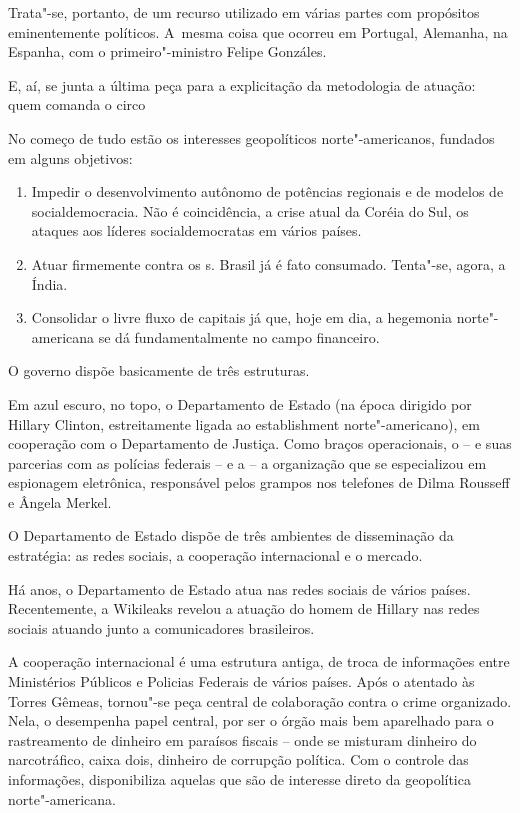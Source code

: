 Trata"-se, portanto, de um recurso utilizado em várias partes com
propósitos eminentemente políticos. A~mesma coisa que ocorreu em
Portugal, Alemanha, na Espanha, com o primeiro"-ministro Felipe Gonzáles.

E, aí, se junta a última peça para a explicitação da metodologia de
atuação: quem comanda o circo

 

No começo de tudo estão os interesses geopolíticos norte"-americanos,
fundados em alguns objetivos:

\begin{enumerate}
\itemsep1pt\parskip0pt
\item
  Impedir o desenvolvimento autônomo de potências regionais e de modelos
  de socialdemocracia. Não é coincidência, a crise atual da Coréia do
  Sul, os ataques aos líderes socialdemocratas em vários países.
\item
  Atuar firmemente contra os s. Brasil já é fato consumado.
  Tenta"-se, agora, a Índia.
\item
  Consolidar o livre fluxo de capitais já que, hoje em dia, a hegemonia
  norte"-americana se dá fundamentalmente no campo financeiro.
\end{enumerate}

O governo dispõe basicamente de três estruturas.

Em azul escuro, no topo, o Departamento de Estado (na época dirigido por
Hillary Clinton, estreitamente ligada ao establishment norte"-americano),
em cooperação com o Departamento de Justiça. Como braços operacionais, o
 -- e suas parcerias com as polícias federais -- e a  -- a
organização que se especializou em espionagem eletrônica, responsável
pelos grampos nos telefones de Dilma Rousseff e Ângela Merkel.

O Departamento de Estado dispõe de três ambientes de disseminação da
estratégia: as redes sociais, a cooperação internacional e o mercado.

Há anos, o Departamento de Estado atua nas redes sociais de vários
países. Recentemente, a Wikileaks revelou a atuação do homem de Hillary
nas redes sociais atuando junto a comunicadores brasileiros.

A cooperação internacional é uma estrutura antiga, de troca de
informações entre Ministérios Públicos e Policias Federais de vários
países. Após o atentado às Torres Gêmeas, tornou"-se peça central de
colaboração contra o crime organizado. Nela, o  desempenha papel
central, por ser o órgão mais bem aparelhado para o rastreamento de
dinheiro em paraísos fiscais -- onde se misturam dinheiro do
narcotráfico, caixa dois, dinheiro de corrupção política. Com o controle
das informações, disponibiliza aquelas que são de interesse direto da
geopolítica norte"-americana.

